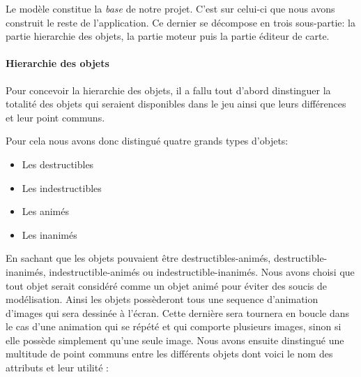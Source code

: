 		Le modèle constitue la \textit{base} de notre projet.
		C'est sur celui-ci que nous avons construit le reste de l'application.
		Ce dernier se décompose en trois sous-partie: la partie hierarchie des objets, la partie moteur puis la partie éditeur de carte.\\
		
	\paragraph{Hierarchie des objets \\}
	
		Pour concevoir la hierarchie des objets, il a fallu tout d'abord 
		dinstinguer la totalité des objets qui seraient disponibles dans 
		le jeu ainsi que leurs différences et leur point communs.
		
		Pour cela nous avons donc distingué quatre grands types d'objets:
		\begin{itemize}
		  \item Les destructibles
		  \item Les indestructibles
		  \item Les animés
		  \item Les inanimés
		\end{itemize}
		
		En sachant que les objets pouvaient être destructibles-animés, 
		destructible-inanimés, indestructible-animés ou indestructible-inanimés.
		Nous avons choisi que tout objet serait considéré comme un objet animé 
		pour éviter des soucis de modélisation.
		Ainsi les objets possèderont tous une sequence d'animation d'images qui
		 sera dessinée à l'écran.
		Cette dernière sera tournera en boucle dans le cas d'une animation 
		qui se répété et qui comporte plusieurs images, sinon si elle possède 
		simplement qu'une seule image.
		Nous avons ensuite dinstingué une multitude de point communs entre 
		les différents objets dont voici le nom des attributs et leur utilité : 
	
